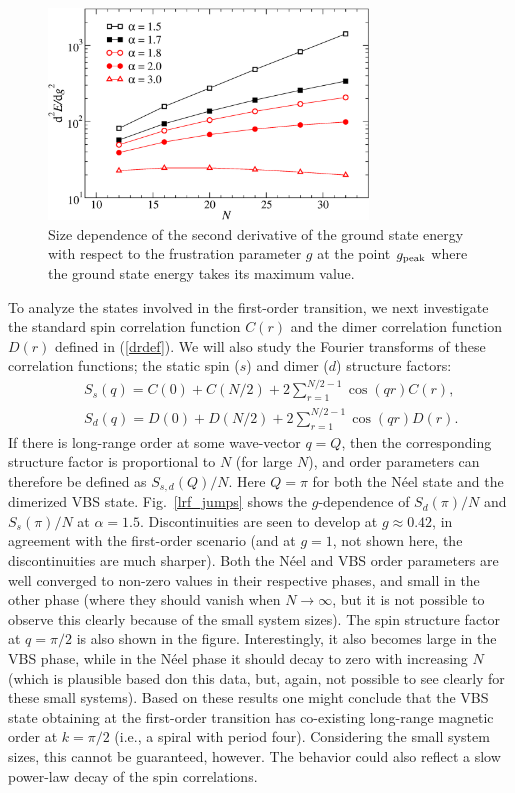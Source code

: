 \documentclass[draft,numberedheadings]{aipproc}
\begin{document}
\begin{figure}
\includegraphics[width=8.5cm, clip]{lrf_deriv2.eps}
\caption{Size dependence of the second derivative of the ground state energy with respect to the frustration parameter $g$ at the 
point $g_{\rm peak}$ where the ground state energy takes its maximum value.}
\label{lrf_deriv2}
\end{figure}

To analyze the states involved in the first-order transition, we next investigate the standard spin correlation function $C(r)$ and the dimer 
correlation function $D(r)$ defined in (\ref{drdef}). We will also study the Fourier transforms of these correlation functions; the static spin ($s$) 
and dimer ($d$) structure factors:
\begin{eqnarray}
&&S_s(q) =  C(0)+C(N/2)+2\sum_{r=1}^{N/2-1}\cos(qr)C(r), \\
&&S_d(q) =  D(0)+D(N/2)+2\sum_{r=1}^{N/2-1}\cos(qr)D(r).
\end{eqnarray}
If there is long-range order at some wave-vector $q=Q$, then the corresponding structure factor is proportional to $N$ (for large $N$), and order 
parameters can therefore be defined as $S_{s,d}(Q)/N$. Here $Q=\pi$ for both the N\'eel state and the dimerized VBS state. Fig.~\ref{lrf_jumps} shows 
the $g$-dependence of $S_{d}(\pi)/N$ and $S_{s}(\pi)/N$ at $\alpha=1.5$. Discontinuities are seen to develop at $g\approx 0.42$, in agreement with 
the first-order scenario (and at $g=1$, not shown here, the discontinuities are much sharper). Both the N\'eel and VBS order parameters are well 
converged to non-zero values in their respective phases, and small in the other phase (where they should vanish when $N\to \infty$, but it is not 
possible to observe this clearly because of the small system sizes). The spin structure factor at $q=\pi/2$ is also shown in the figure. Interestingly, 
it also becomes large in the VBS phase, while in the N\'eel phase it should decay to zero with increasing $N$ (which is plausible based don this data, 
but, again, not possible to see clearly for these small systems). Based on these results one might conclude that the VBS state obtaining at the 
first-order transition has co-existing long-range magnetic order at $k=\pi/2$ (i.e., a spiral with period four). Considering the small system sizes, 
this cannot be guaranteed, however. The behavior could also reflect a slow power-law decay of the spin correlations.
\end{document}
